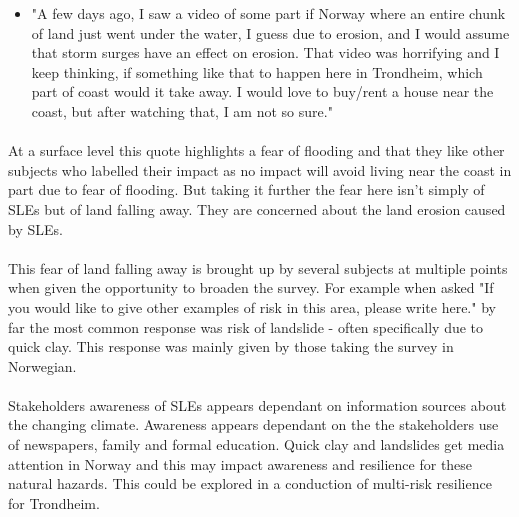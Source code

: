 \begin{itemize}
    \item "A few days ago, I saw a video of some part if Norway where an entire chunk of land just went under the water, I guess due to erosion, and I would assume that storm surges have an effect on erosion. That video was horrifying and I keep thinking, if something like that to happen here in Trondheim, which part of coast would it take away. I would love to buy/rent a house near the coast, but after watching that, I am not so sure."
\end{itemize}
\paragraph{}

At a surface level this quote highlights a fear of flooding and that they like other subjects who labelled their impact as no impact will avoid living near the coast in part due to fear of flooding. But taking it further the fear here isn't simply of SLEs but of land falling away. They are concerned about the land erosion caused by SLEs.
\paragraph{}
This fear of land falling away is brought up by several subjects at multiple points when given the opportunity to broaden the survey. For example when asked "If you would like to give other examples of risk in this area, please write here." by far the most common response was risk of landslide - often specifically due to quick clay. This response was mainly given by those taking the survey in Norwegian. 
\paragraph{}
Stakeholders awareness of SLEs appears dependant on information sources about the changing climate. Awareness appears dependant on the the stakeholders use of newspapers, family and formal education. Quick clay and landslides get media attention in Norway and this may impact awareness and resilience for these natural hazards. This could be explored in a conduction of multi-risk resilience for Trondheim.  
